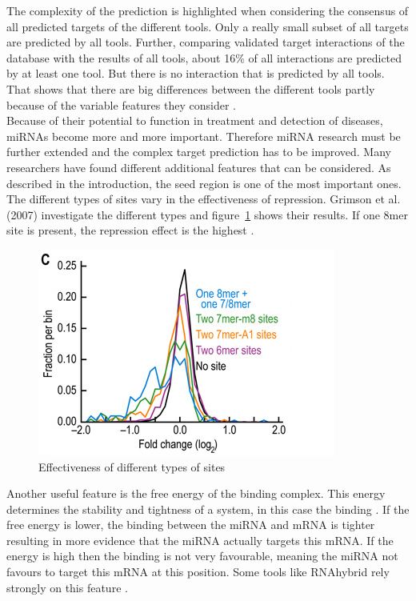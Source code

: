 \documentclass[12pt,  a4paper]{report}
\begin{document}
The complexity of the prediction is highlighted when considering the consensus of all predicted targets of the different tools. Only a really small subset of all targets are predicted by all tools. Further, comparing validated target interactions of the database with the results of all tools, about 16\% of all interactions are predicted by at least one tool. But there is no interaction that is predicted by all tools. That shows that there are big differences between the different tools partly because of the variable features they consider \cite{Keller}.\\ 

Because of their potential to function in treatment and detection of diseases, miRNAs become more and more important. Therefore miRNA research must be further extended and the complex target prediction has to be improved. Many researchers have found different additional features that can be considered. As described in the introduction, the seed region is one of the most important ones. The different types of sites vary in the effectiveness of repression. Grimson et al. (2007) investigate the different types and figure~\ref{types} shows their results. If one 8mer site is present, the repression effect is the highest \cite{Grimson}. \\


\begin{figure}[h]
\centering
\includegraphics[scale=0.7]{results/site_3addi.png}
\caption{Effectiveness of different types of sites}
\label{types}
\end{figure}

Another useful feature is the free energy of the binding complex. This energy determines the stability and tightness of a  system, in this case the binding \cite{Peterson}. If the free energy is lower, the binding between the miRNA and mRNA is tighter resulting in more evidence that the miRNA actually targets this mRNA. If the energy is high then the binding is not very favourable, meaning the miRNA not favours to target this mRNA at this position. Some tools like RNAhybrid rely strongly on this feature \cite{Rehmsmeier}. \\
\end{document}
